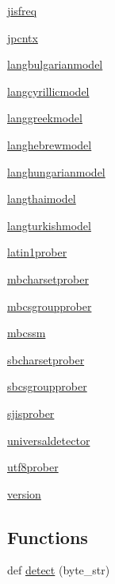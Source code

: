 \begin{DoxyCompactItemize}
\item 
 \hyperlink{namespacechardet_1_1jisfreq}{jisfreq}
\item 
 \hyperlink{namespacechardet_1_1jpcntx}{jpcntx}
\item 
 \hyperlink{namespacechardet_1_1langbulgarianmodel}{langbulgarianmodel}
\item 
 \hyperlink{namespacechardet_1_1langcyrillicmodel}{langcyrillicmodel}
\item 
 \hyperlink{namespacechardet_1_1langgreekmodel}{langgreekmodel}
\item 
 \hyperlink{namespacechardet_1_1langhebrewmodel}{langhebrewmodel}
\item 
 \hyperlink{namespacechardet_1_1langhungarianmodel}{langhungarianmodel}
\item 
 \hyperlink{namespacechardet_1_1langthaimodel}{langthaimodel}
\item 
 \hyperlink{namespacechardet_1_1langturkishmodel}{langturkishmodel}
\item 
 \hyperlink{namespacechardet_1_1latin1prober}{latin1prober}
\item 
 \hyperlink{namespacechardet_1_1mbcharsetprober}{mbcharsetprober}
\item 
 \hyperlink{namespacechardet_1_1mbcsgroupprober}{mbcsgroupprober}
\item 
 \hyperlink{namespacechardet_1_1mbcssm}{mbcssm}
\item 
 \hyperlink{namespacechardet_1_1sbcharsetprober}{sbcharsetprober}
\item 
 \hyperlink{namespacechardet_1_1sbcsgroupprober}{sbcsgroupprober}
\item 
 \hyperlink{namespacechardet_1_1sjisprober}{sjisprober}
\item 
 \hyperlink{namespacechardet_1_1universaldetector}{universaldetector}
\item 
 \hyperlink{namespacechardet_1_1utf8prober}{utf8prober}
\item 
 \hyperlink{namespacechardet_1_1version}{version}
\end{DoxyCompactItemize}
\subsection*{Functions}
\begin{DoxyCompactItemize}
\item 
def \hyperlink{namespacechardet_a5d13c09e4d402035d14177de42e5422d}{detect} (byte\+\_\+str)
\end{DoxyCompactItemize}



